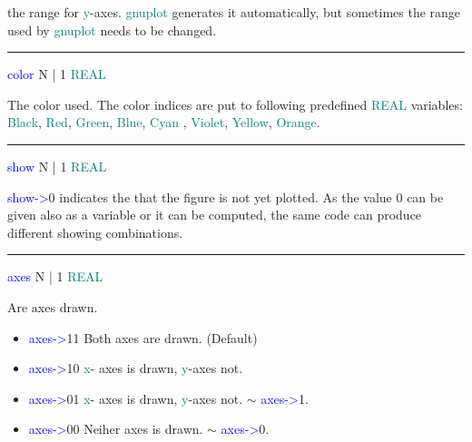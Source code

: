\begin{changemargin}{3cm}{0cm} 
\noindent  the range for \textcolor{teal}{y}-axes. \textcolor{teal}{gnuplot} generates it automatically, but 
sometimes the range used by \textcolor{teal}{gnuplot} needs to be changed. 
\end{changemargin} 
\vspace{0.3cm} 
\hrule 
\vspace{0.3cm} 
\noindent \textcolor{blue}{color}  \tabto{3cm}  N | 1  \tabto{5cm}   \textcolor{teal}{REAL}  \tabto{7cm} 
\begin{changemargin}{3cm}{0cm} 
\noindent  The color used. The color indices are put to 
following  predefined \textcolor{teal}{REAL} variables: \textcolor{teal}{Black}, \textcolor{teal}{Red}, \textcolor{teal}{Green}, \textcolor{teal}{Blue}, 
\textcolor{teal}{Cyan} , \textcolor{teal}{Violet}, \textcolor{teal}{Yellow}, \textcolor{teal}{Orange}. 
\end{changemargin} 
\vspace{0.3cm} 
\hrule 
\vspace{0.3cm} 
\noindent \textcolor{blue}{show} \tabto{3cm}  N | 1  \tabto{5cm}   \textcolor{teal}{REAL}  \tabto{7cm} 
\begin{changemargin}{3cm}{0cm} 
\noindent  \textcolor{blue}{show->}0 indicates the that the figure is not yet plotted. 
As the value 0 can be given also as a variable or it can be computed, 
the same code can produce different showing combinations. 
\end{changemargin} 
\vspace{0.3cm} 
\hrule 
\vspace{0.3cm} 
\noindent \textcolor{blue}{axes}  \tabto{3cm}  N | 1  \tabto{5cm}  \textcolor{teal}{REAL}  \tabto{7cm} 
\begin{changemargin}{3cm}{0cm} 
\noindent  Are axes drawn. 
\begin{itemize} 
\item \textcolor{blue}{axes->}11 Both axes are drawn. (Default) 
\item \textcolor{blue}{axes->}10 \textcolor{teal}{x}- axes is  drawn, \textcolor{teal}{y}-axes not. 
\item \textcolor{blue}{axes->}01 \textcolor{teal}{x}- axes is  drawn, \textcolor{teal}{y}-axes not. $\sim$ \textcolor{blue}{axes->}1. 
\item \textcolor{blue}{axes->}00 Neiher axes is drawn. $\sim$ \textcolor{blue}{axes->}0. 
\end{itemize} 
\end{changemargin} 
